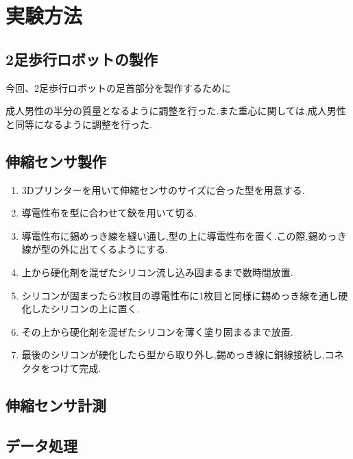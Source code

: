 \section{実験方法}
\subsection{2足歩行ロボットの製作}
今回、2足歩行ロボットの足首部分を製作するために

成人男性の半分の質量となるように調整を行った.また重心に関しては,成人男性と同等になるように調整を行った.
\subsection{伸縮センサ製作}
\begin{enumerate}
    \item 3Dプリンターを用いて伸縮センサのサイズに合った型を用意する.
    \item 導電性布を型に合わせて鋏を用いて切る.
    \item 導電性布に錫めっき線を縫い通し,型の上に導電性布を置く.この際,錫めっき線が型の外に出てくるようにする.
    \item 上から硬化剤を混ぜたシリコン流し込み固まるまで数時間放置.
    \item シリコンが固まったら2枚目の導電性布に1枚目と同様に錫めっき線を通し硬化したシリコンの上に置く.
    \item その上から硬化剤を混ぜたシリコンを薄く塗り固まるまで放置.
    \item 最後のシリコンが硬化したら型から取り外し,錫めっき線に銅線接続し,コネクタをつけて完成.
\end{enumerate}
\subsection{伸縮センサ計測}

\subsection{データ処理}
